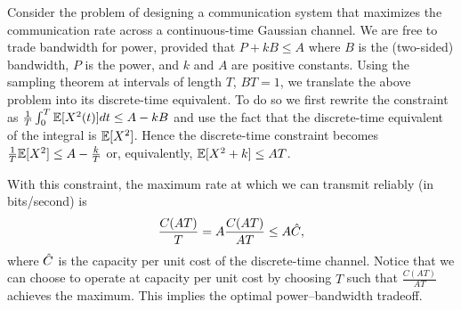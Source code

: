 \begin{example}
Consider the problem of designing a communication system that maximizes the
communication rate across a continuous-time Gaussian channel. We are free to
trade bandwidth for power, provided that  $P+k B \leq A$ where $B$ is the
(two-sided) bandwidth, $P$ is the power, and $k$ and $A$ are positive constants.
Using the sampling theorem at intervals of length $T$, $BT=1$, we translate the
above problem into its discrete-time equivalent. To do so we first rewrite the
constraint as $\frac{1}{T} \int_0^T \mathbb{E}[X^2(t)] dt \leq A- k B$ and use the fact
that the discrete-time equivalent of the integral is $\mathbb{E} [X^2]$. Hence the
discrete-time constraint becomes  $\frac{1}{T}\mathbb{E} [X^2] \leq A- \frac{k}{T}$ or,
equivalently, $\mathbb{E} [X^2 + k] \leq AT$. 


With this constraint, the maximum rate at which we can transmit reliably (in
bits/second) is
\[ \frac{C(AT)}{T} = A \frac{C(AT)}{AT} \le A {\hat{C}}, \]
where ${\hat{C}}$ is the capacity per unit cost of the discrete-time channel. Notice
that we can choose to operate at capacity per unit cost by choosing $T$ such
that   $\frac{C(AT)}{AT}$ achieves the maximum. This implies the optimal
power--bandwidth tradeoff.
\end{example}

